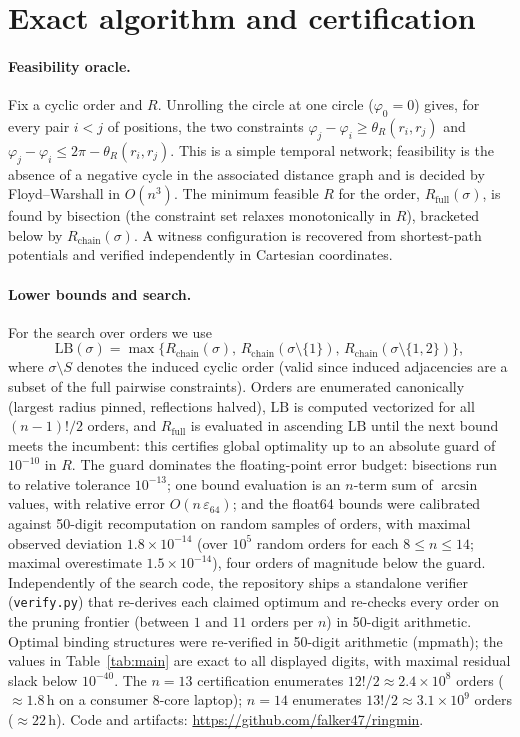 \documentclass[11pt]{article}
\theoremstyle{definition}
\theoremstyle{remark}
\begin{document}
\section{Exact algorithm and certification}\label{sec:algo}

\paragraph{Feasibility oracle.} Fix a cyclic order and $R$. Unrolling the circle at one circle ($\varphi_0=0$) gives, for every pair $i<j$ of positions, the two constraints $\varphi_j-\varphi_i\ge\theta_R(r_i,r_j)$ and $\varphi_j-\varphi_i\le2\pi-\theta_R(r_i,r_j)$. This is a simple temporal network; feasibility is the absence of a negative cycle in the associated distance graph and is decided by Floyd--Warshall in $O(n^3)$. The minimum feasible $R$ for the order, $R_{\mathrm{full}}(\sigma)$, is found by bisection (the constraint set relaxes monotonically in $R$), bracketed below by $R_{\mathrm{chain}}(\sigma)$. A witness configuration is recovered from shortest-path potentials and verified independently in Cartesian coordinates.

\paragraph{Lower bounds and search.} For the search over orders we use
\[
\mathrm{LB}(\sigma)=\max\big\{R_{\mathrm{chain}}(\sigma),\,R_{\mathrm{chain}}(\sigma\setminus\{1\}),\,R_{\mathrm{chain}}(\sigma\setminus\{1,2\})\big\},
\]
where $\sigma\setminus S$ denotes the induced cyclic order (valid since induced adjacencies are a subset of the full pairwise constraints). Orders are enumerated canonically (largest radius pinned, reflections halved), $\mathrm{LB}$ is computed vectorized for all $(n-1)!/2$ orders, and $R_{\mathrm{full}}$ is evaluated in ascending $\mathrm{LB}$ until the next bound meets the incumbent: this certifies global optimality up to an absolute guard of $10^{-10}$ in $R$. The guard dominates the floating-point error budget: bisections run to relative tolerance $10^{-13}$; one bound evaluation is an $n$-term sum of $\arcsin$ values, with relative error $O(n\,\varepsilon_{64})$; and the float64 bounds were calibrated against 50-digit recomputation on random samples of orders, with maximal observed deviation $1.8\times10^{-14}$ (over $10^5$ random orders for each $8\le n\le14$; maximal overestimate $1.5\times10^{-14}$), four orders of magnitude below the guard. Independently of the search code, the repository ships a standalone verifier (\texttt{verify.py}) that re-derives each claimed optimum and re-checks every order on the pruning frontier (between $1$ and $11$ orders per $n$) in 50-digit arithmetic. Optimal binding structures were re-verified in 50-digit arithmetic (mpmath); the values in Table~\ref{tab:main} are exact to all displayed digits, with maximal residual slack below $10^{-40}$. The $n=13$ certification enumerates $12!/2\approx2.4\times10^8$ orders ($\approx1.8$\,h on a consumer 8-core laptop); $n=14$ enumerates $13!/2\approx3.1\times10^9$ orders ($\approx22$\,h). Code and artifacts: \url{https://github.com/falker47/ringmin}.
\end{document}
